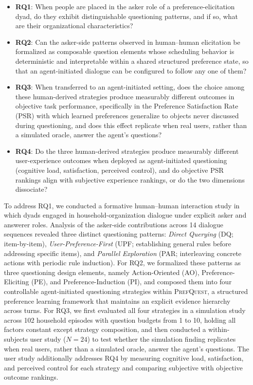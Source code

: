 \documentclass[manuscript,review,anonymous]{acmart}
\begin{document}
\begin{itemize}[leftmargin=*]
    \item \textbf{RQ1}: When people are placed in the asker role of a preference-elicitation dyad, do they exhibit distinguishable questioning patterns, and if so, what are their organizational characteristics?
    \item \textbf{RQ2}: Can the asker-side patterns observed in human--human elicitation be formalized as composable question elements whose scheduling behavior is deterministic and interpretable within a shared structured preference state, so that an agent-initiated dialogue can be configured to follow any one of them?
    \item \textbf{RQ3}: When transferred to an agent-initiated setting, does the choice among these human-derived strategies produce measurably different outcomes in objective task performance, specifically in the Preference Satisfaction Rate (PSR) with which learned preferences generalize to objects never discussed during questioning, and does this effect replicate when real users, rather than a simulated oracle, answer the agent's questions?
    \item \textbf{RQ4}: Do the three human-derived strategies produce measurably different user-experience outcomes when deployed as agent-initiated questioning (cognitive load, satisfaction, perceived control), and do objective PSR rankings align with subjective experience rankings, or do the two dimensions dissociate?
\end{itemize}

To address RQ1, we conducted a formative human--human interaction study in which dyads engaged in household-organization dialogue under explicit asker and answerer roles. Analysis of the asker-side contributions across 14 dialogue sequences revealed three distinct questioning patterns: \textit{Direct Querying} (DQ; item-by-item), \textit{User-Preference-First} (UPF; establishing general rules before addressing specific items), and \textit{Parallel Exploration} (PAR; interleaving concrete actions with periodic rule induction). For RQ2, we formalized these patterns as three questioning design elements, namely Action-Oriented (AO), Preference-Eliciting (PE), and Preference-Induction (PI), and composed them into four controllable agent-initiated questioning strategies within \textsc{PrefQuest}, a structured preference learning framework that maintains an explicit evidence hierarchy across turns. For RQ3, we first evaluated all four strategies in a simulation study across 102 household episodes with question budgets from 1 to 10, holding all factors constant except strategy composition, and then conducted a within-subjects user study ($N = 24$) to test whether the simulation finding replicates when real users, rather than a simulated oracle, answer the agent's questions. The user study additionally addresses RQ4 by measuring cognitive load, satisfaction, and perceived control for each strategy and comparing subjective with objective outcome rankings.
\end{document}
